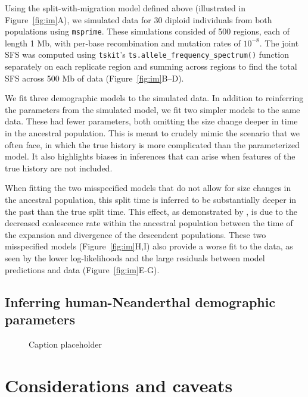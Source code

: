 \documentclass[]{article}
\newcommand{\msprime}{\texttt{msprime}\xspace}
\newcommand{\tskit}{\texttt{tskit}\xspace}
\begin{document}
Using the split-with-migration model defined above (illustrated in
Figure~\ref{fig:im}A), we simulated data for 30 diploid individuals from both
populations using \msprime \citep{baumdicker2022efficient}. These simulations
consided of 500 regions, each of length 1 Mb, with per-base recombination and
mutation rates of $10^{-8}$. The joint SFS was computed using \tskit's
\texttt{ts.allele\_frequency\_spectrum()} function separately on each replicate
region and summing across regions to find the total SFS across 500 Mb of data
(Figure~\ref{fig:im}B--D).

We fit three demographic models to the simulated data. In addition to
reinferring the parameters from the simulated model, we fit two simpler models
to the same data. These had fewer parameters, both omitting the size change
deeper in time in the ancestral population. This is meant to crudely mimic the
scenario that we often face, in which the true history is more complicated than
the parameterized model. It also highlights biases in inferences that can arise
when features of the true history are not included.

When fitting the two misspecified models that do not allow for size changes in
the ancestral population, this split time is inferred to be substantially
deeper in the past than the true split time. This effect, as demonstrated by
\citet{momigliano2020biases}, is due to the decreased coalescence rate within
the ancestral population between the time of the expansion and divergence of
the descendent populations. These two misspecified models
(Figure~\ref{fig:im}H,I) also provide a worse fit to the data, as seen by the
lower log-likelihoods and the large residuals between model predictions and
data (Figure~\ref{fig:im}E-G).

\subsection*{Inferring human-Neanderthal demographic parameters}

\begin{figure}[t!]
    \caption{Caption placeholder}
    \label{fig:humans}
\end{figure}


\section*{Considerations and caveats}\label{sec:conclusions}
\end{document}
